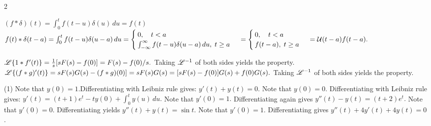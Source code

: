 \begin{multicols}{2}
\begin{Answer}[ref={EX75}]
			
			\Question\label{7-5-7a} 
		\begin{tasks}[resume=false]
			\task $(f\ast \delta)(t) =\int_0^t f(t-u) \delta(u)\,du =f(t)$
			\task $f(t)\ast \delta (t-a) =\int_0^t f(t-u) \delta(u-a)\,du\\
			 =\begin{cases}
			0 , \quad t<a\\
			\int_{-\infty}^\infty f(t-u) \delta(u-a)\, du,\;t\ge a
			\end{cases}\\ = \begin{cases}
			0 , \quad t<a\\
		f(t-a),\; t\ge a
			\end{cases}\\ = \mathcal{U}(t-a) f(t-a).$
		\end{tasks} 
			\Question\label{7-5-8a}
		\begin{tasks}
			\task $\mathscr{L}\{1\ast f'(t)\}= \frac{1}{s} [ s F(s) - f(0)] = F(s) - f(0)/ s.$ Taking $\mathscr{L}^{-1}$ of both sides yields the property.
			\task $\mathscr{L}\{(f\ast g)'(t)\}= s F(s) G(s) - (f\ast g)(0)] = sF(s) G(s) = [sF(s)- f(0)]G(s) + f(0) G(s).$ Taking $\mathscr{L}^{-1}$ of both sides yields the property.
		\end{tasks}
	

	
	\Question\label{7-5-9a} 
	\begin{tasks}[resume=false](1)
		\task Note that $y(0) = 1$.Differentiating with Leibniz rule gives:  $y'(t) +y(t) = 0.$ 
		\task Note that $y(0)=0.$ Differentiating with Leibniz rule gives:  $y'(t) = (t+1)e^t - t y(0) + \int_0^t y(u) \, du.$  Note that $y'(0) = 1.$ Differentiating again gives $y''(t) -y(t) = (t+2) e^t.$
		\task Note that $y'(0)= 0.$ Differentiating yields $y''(t)+y(t) = \sin t$. 
		\task Note that $y'(0)= 1.$ Differentiating gives $y''(t) + 4y'(t)+4 y(t) =0$. 
	\end{tasks}
	

\end{Answer}
\end{multicols}
